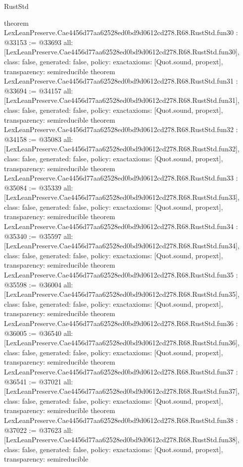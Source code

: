 \begin{lexlean}{RustStd}
\begin{coremodule}
{}
theorem LexLeanPreserve.Cae4456d77aa62528ed0bd9d0612cd278.R68.RustStd.fun30 : @33153 := @33693 {
  all: [LexLeanPreserve.Cae4456d77aa62528ed0bd9d0612cd278.R68.RustStd.fun30],
  class: false,
  generated: false,
  policy: exact{axioms: [Quot.sound, propext]},
  transparency: semireducible
}
theorem LexLeanPreserve.Cae4456d77aa62528ed0bd9d0612cd278.R68.RustStd.fun31 : @33694 := @34157 {
  all: [LexLeanPreserve.Cae4456d77aa62528ed0bd9d0612cd278.R68.RustStd.fun31],
  class: false,
  generated: false,
  policy: exact{axioms: [Quot.sound, propext]},
  transparency: semireducible
}
theorem LexLeanPreserve.Cae4456d77aa62528ed0bd9d0612cd278.R68.RustStd.fun32 : @34158 := @35083 {
  all: [LexLeanPreserve.Cae4456d77aa62528ed0bd9d0612cd278.R68.RustStd.fun32],
  class: false,
  generated: false,
  policy: exact{axioms: [Quot.sound, propext]},
  transparency: semireducible
}
theorem LexLeanPreserve.Cae4456d77aa62528ed0bd9d0612cd278.R68.RustStd.fun33 : @35084 := @35339 {
  all: [LexLeanPreserve.Cae4456d77aa62528ed0bd9d0612cd278.R68.RustStd.fun33],
  class: false,
  generated: false,
  policy: exact{axioms: [Quot.sound, propext]},
  transparency: semireducible
}
theorem LexLeanPreserve.Cae4456d77aa62528ed0bd9d0612cd278.R68.RustStd.fun34 : @35340 := @35597 {
  all: [LexLeanPreserve.Cae4456d77aa62528ed0bd9d0612cd278.R68.RustStd.fun34],
  class: false,
  generated: false,
  policy: exact{axioms: [Quot.sound, propext]},
  transparency: semireducible
}
theorem LexLeanPreserve.Cae4456d77aa62528ed0bd9d0612cd278.R68.RustStd.fun35 : @35598 := @36004 {
  all: [LexLeanPreserve.Cae4456d77aa62528ed0bd9d0612cd278.R68.RustStd.fun35],
  class: false,
  generated: false,
  policy: exact{axioms: [Quot.sound, propext]},
  transparency: semireducible
}
theorem LexLeanPreserve.Cae4456d77aa62528ed0bd9d0612cd278.R68.RustStd.fun36 : @36005 := @36540 {
  all: [LexLeanPreserve.Cae4456d77aa62528ed0bd9d0612cd278.R68.RustStd.fun36],
  class: false,
  generated: false,
  policy: exact{axioms: [Quot.sound, propext]},
  transparency: semireducible
}
theorem LexLeanPreserve.Cae4456d77aa62528ed0bd9d0612cd278.R68.RustStd.fun37 : @36541 := @37021 {
  all: [LexLeanPreserve.Cae4456d77aa62528ed0bd9d0612cd278.R68.RustStd.fun37],
  class: false,
  generated: false,
  policy: exact{axioms: [Quot.sound, propext]},
  transparency: semireducible
}
theorem LexLeanPreserve.Cae4456d77aa62528ed0bd9d0612cd278.R68.RustStd.fun38 : @37022 := @37623 {
  all: [LexLeanPreserve.Cae4456d77aa62528ed0bd9d0612cd278.R68.RustStd.fun38],
  class: false,
  generated: false,
  policy: exact{axioms: [Quot.sound, propext]},
  transparency: semireducible
}
\end{coremodule}
\end{lexlean}
